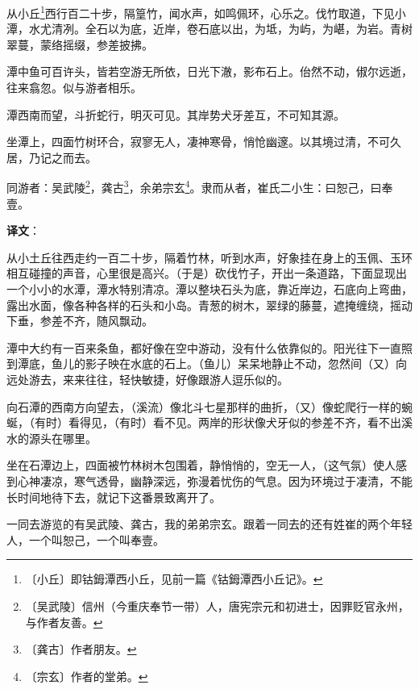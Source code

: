\documentclass[12pt,UTF-8,openany,a4]{ctexbook}
\begin{document}
\begin{large}
    
    从小丘\footnote{〔小丘〕\yiwen 即钴鉧潭西小丘，见前一篇《钴鉧潭西小丘记》。}西行百二十步，隔篁竹，闻水声，如鸣佩环，心乐之。伐竹取道，下见小潭，水尤清冽。全石以为底，近岸，卷石底以出，为坻，为屿，为嵁，为岩。青树翠蔓，蒙络摇缀，参差披拂。
    
    潭中鱼可百许头，皆若空游无所依，日光下澈，影布石上。佁然不动，俶尔远逝，往来翕忽。似与游者相乐。
    
    潭西南而望，斗折蛇行，明灭可见。其岸势犬牙差互，不可知其源。
    
    坐潭上，四面竹树环合，寂寥无人，凄神寒骨，悄怆幽邃。以其境过清，不可久居，乃记之而去。
    
    同游者：吴武陵\footnote{〔吴武陵〕\yiwen 信州（今重庆奉节一带）人，唐宪宗元和初进士，因罪贬官永州，与作者友善。}，龚古\footnote{〔龚古〕\yiwen 作者朋友。}，余弟宗玄\footnote{〔宗玄〕\yiwen 作者的堂弟。}。隶而从者，崔氏二小生：曰恕己，曰奉壹。

\end{large}


\newpage

\begin{Large}
   \noindent \textbf{译文}：
\end{Large}

\vspace{1em}

\begin{large}\yiwen
    
    从小土丘往西走约一百二十步，隔着竹林，听到水声，好象挂在身上的玉佩、玉环相互碰撞的声音，心里很是高兴。（于是）砍伐竹子，开出一条道路，下面显现出一个小小的水潭，潭水特别清凉。潭以整块石头为底，靠近岸边，石底向上弯曲，露出水面，像各种各样的石头和小岛。青葱的树木，翠绿的藤蔓，遮掩缠绕，摇动下垂，参差不齐，随风飘动。
    
    潭中大约有一百来条鱼，都好像在空中游动，没有什么依靠似的。阳光往下一直照到潭底，鱼儿的影子映在水底的石上。（鱼儿）呆呆地静止不动，忽然间（又）向远处游去，来来往往，轻快敏捷，好像跟游人逗乐似的。
    
    向石潭的西南方向望去，（溪流）像北斗七星那样的曲折，（又）像蛇爬行一样的蜿蜒，（有时）看得见，（有时）看不见。两岸的形状像犬牙似的参差不齐，看不出溪水的源头在哪里。
    
    坐在石潭边上，四面被竹林树木包围着，静悄悄的，空无一人，（这气氛）使人感到心神凄凉，寒气透骨，幽静深远，弥漫着忧伤的气息。因为环境过于凄清，不能长时间地待下去，就记下这番景致离开了。
    
    一同去游览的有吴武陵、龚古，我的弟弟宗玄。跟着一同去的还有姓崔的两个年轻人，一个叫恕己，一个叫奉壹。
    

\end{large}
\end{document}
